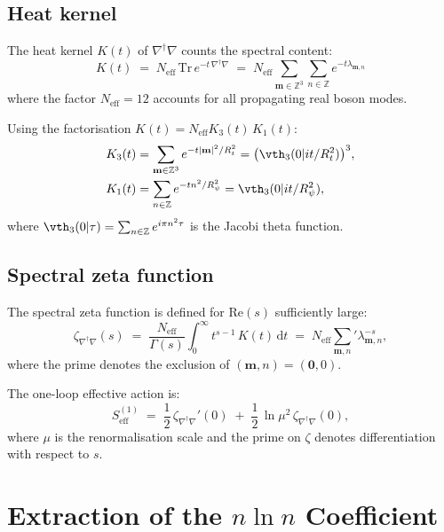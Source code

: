 \documentclass[12pt,a4paper]{article}
\theoremstyle{definition}
\theoremstyle{remark}
\newcommand{\ZZ}{\mathbb{Z}}
\begin{document}
\subsection{Heat kernel}

The heat kernel $K(t)$ of $\nabla^\dagger\nabla$ counts the spectral content:
\begin{equation}
\label{eq:hk}
  K(t)
  \;=\;
  N_{\mathrm{eff}}\,\mathrm{Tr}\,e^{-t\,\nabla^\dagger\nabla}
  \;=\;
  N_{\mathrm{eff}}
  \sum_{\mathbf{m}\in\ZZ^3}\sum_{n\in\ZZ}
  e^{-t\lambda_{\mathbf{m},n}}
\end{equation}
where the factor $N_{\mathrm{eff}} = 12$ accounts for all propagating
real boson modes.

Using the factorisation $K(t) = N_{\mathrm{eff}} K_3(t)\,K_1(t)$:
\begin{align}
  K_3(t) &= \sum_{\mathbf{m}\in\ZZ^3} e^{-t|\mathbf{m}|^2/R_t^2}
  = \bigl(\vth_3(0|it/R_t^2)\bigr)^3, \label{eq:K3} \\
  K_1(t) &= \sum_{n\in\ZZ} e^{-tn^2/R_\psi^2}
  = \vth_3(0|it/R_\psi^2), \label{eq:K1}
\end{align}
where $\vth_3(0|\tau) = \sum_{n\in\ZZ} e^{i\pi n^2\tau}$ is the Jacobi
theta function.

\subsection{Spectral zeta function}

The spectral zeta function is defined for $\mathrm{Re}(s)$ sufficiently large:
\begin{equation}
\label{eq:zeta}
  \zeta_{\nabla^\dagger\nabla}(s)
  \;=\;
  \frac{N_{\mathrm{eff}}}{\Gamma(s)}
  \int_0^\infty t^{s-1}\,K(t)\,\mathrm{d}t
  \;=\;
  N_{\mathrm{eff}}
  \sum_{\mathbf{m},n}'
  \lambda_{\mathbf{m},n}^{-s},
\end{equation}
where the prime denotes the exclusion of $(\mathbf{m},n) = (\mathbf{0},0)$.

The one-loop effective action is:
\begin{equation}
\label{eq:Seff}
  S_{\mathrm{eff}}^{(1)}
  \;=\;
  \frac{1}{2}\,\zeta_{\nabla^\dagger\nabla}'(0)
  \;+\;
  \frac{1}{2}\,\ln\mu^2\,\zeta_{\nabla^\dagger\nabla}(0),
\end{equation}
where $\mu$ is the renormalisation scale and the prime on $\zeta$ denotes
differentiation with respect to $s$.

\section{Extraction of the $n\ln n$ Coefficient}
\label{sec:extract}
\end{document}
